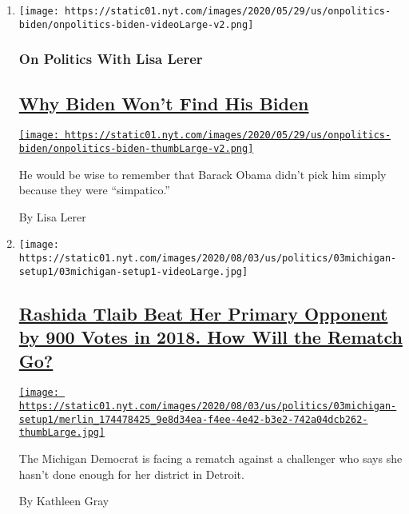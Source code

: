 \begin{enumerate}
\def\labelenumi{\arabic{enumi}.}
\item
  \texttt{[image: https://static01.nyt.com/images/2020/05/29/us/onpolitics-biden/onpolitics-biden-videoLarge-v2.png]}

  \hypertarget{on-politics-with-lisa-lerer}{%
  \subsubsection{On Politics With Lisa
  Lerer}\label{on-politics-with-lisa-lerer}}

  \hypertarget{why-biden-wont-find-his-biden}{%
  \subsection{\texorpdfstring{\href{/2020/08/03/us/politics/joe-biden-vp.html}{Why
  Biden Won't Find His
  Biden}}{Why Biden Won't Find His Biden}}\label{why-biden-wont-find-his-biden}}

  \href{/2020/08/03/us/politics/joe-biden-vp.html}{\texttt{[image: https://static01.nyt.com/images/2020/05/29/us/onpolitics-biden/onpolitics-biden-thumbLarge-v2.png]}}

  He would be wise to remember that Barack Obama didn't pick him simply
  because they were ``simpatico.''

  By Lisa Lerer
\item
  \texttt{[image: https://static01.nyt.com/images/2020/08/03/us/politics/03michigan-setup1/03michigan-setup1-videoLarge.jpg]}

  \hypertarget{rashida-tlaib-beat-her-primary-opponent-by-900-votes-in-2018-how-will-the-rematch-go}{%
  \subsection{\texorpdfstring{\href{/2020/08/03/us/politics/michigan-primary-rashida-tlaib-brenda-jones.html}{Rashida
  Tlaib Beat Her Primary Opponent by 900 Votes in 2018. How Will the
  Rematch
  Go?}}{Rashida Tlaib Beat Her Primary Opponent by 900 Votes in 2018. How Will the Rematch Go?}}\label{rashida-tlaib-beat-her-primary-opponent-by-900-votes-in-2018-how-will-the-rematch-go}}

  \href{/2020/08/03/us/politics/michigan-primary-rashida-tlaib-brenda-jones.html}{\texttt{[image: https://static01.nyt.com/images/2020/08/03/us/politics/03michigan-setup1/merlin\_174478425\_9e8d34ea-f4ee-4e42-b3e2-742a04dcb262-thumbLarge.jpg]}}

  The Michigan Democrat is facing a rematch against a challenger who
  says she hasn't done enough for her district in Detroit.

  By Kathleen Gray
\end{enumerate}

